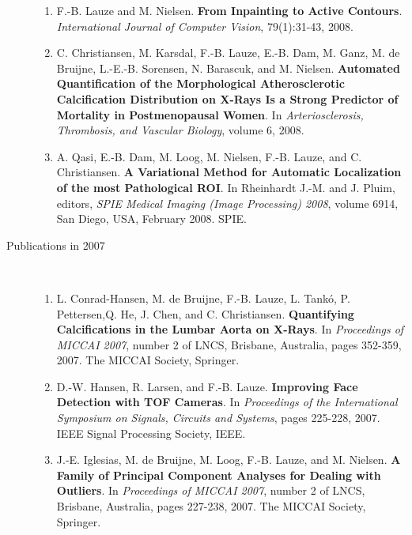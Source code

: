 \documentclass[10pt]{article}
\begin{document}
\begin{description}
  \begin{enumerate}
  
  \item F.-B. Lauze and M. Nielsen.  \textbf{From Inpainting to Active Contours}.
    \textit{International Journal of Computer Vision}, 79(1):31-43, 2008.

  \item C. Christiansen, M. Karsdal, F.-B. Lauze, E.-B. Dam, M. Ganz, M. de Bruijne,
    L.-E.-B. Sorensen, N. Barascuk, and M. Nielsen.  \textbf{Automated Quantification of
      the Morphological Atherosclerotic Calcification Distribution on X-Rays Is a Strong
      Predictor of Mortality in Postmenopausal Women}.  In \textit{Arteriosclerosis,
      Thrombosis, and Vascular Biology}, volume 6, 2008.

  \item A. Qasi, E.-B. Dam, M. Loog, M. Nielsen, F.-B. Lauze, and C. Christiansen.
    \textbf{A Variational Method for Automatic Localization of the most Pathological ROI}.
    In Rheinhardt J.-M. and J. Pluim, editors, \textit{SPIE Medical Imaging (Image
      Processing) 2008}, volume 6914, San Diego, USA, February 2008.  SPIE.
  \end{enumerate}

\item[Publications in 2007]~\\

  \begin{enumerate}
  \item L. Conrad-Hansen, M. de Bruijne, F.-B. Lauze, L. Tank{\'o}, P. Pettersen,Q. He,
    J. Chen, and C. Christiansen.  \textbf{Quantifying Calcifications in the Lumbar Aorta
      on X-Rays}.  In \textit{Proceedings of MICCAI 2007}, number 2 of LNCS, Brisbane,
    Australia, pages 352-359, 2007.  The MICCAI Society, Springer.

  \item D.-W. Hansen, R. Larsen, and F.-B. Lauze.  \textbf{Improving Face Detection with
      TOF Cameras}.  In \textit{Proceedings of the International Symposium on Signals,
      Circuits and Systems}, pages 225-228, 2007.  IEEE Signal Processing Society, IEEE.

  \item J.-E. Iglesias, M. de Bruijne, M. Loog, F.-B. Lauze, and M. Nielsen.  \textbf{A
      Family of Principal Component Analyses for Dealing with Outliers}.  In
    \textit{Proceedings of MICCAI 2007}, number 2 of LNCS, Brisbane, Australia, pages
    227-238, 2007.  The MICCAI Society, Springer.


\end{enumerate}
\end{description}
\end{document}
